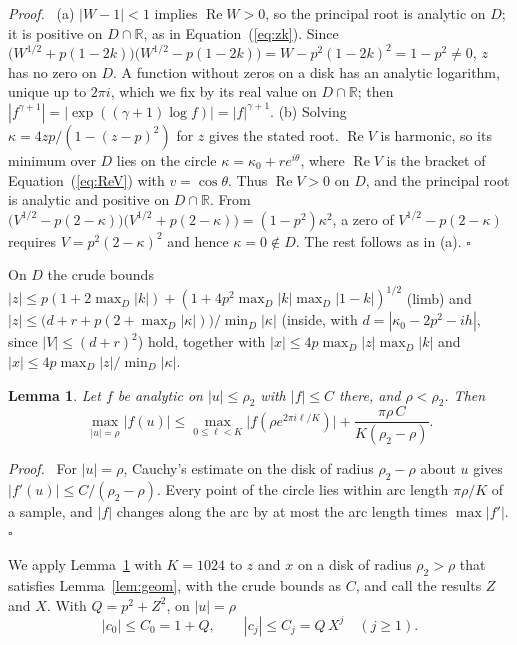 \documentclass[11pt]{article}
\newtheorem{lemma}{Lemma}
\newenvironment{proof}{\par\noindent\textit{Proof.}\ }{\hfill$\square$\par\medskip}
\begin{document}
\begin{proof}
(a) $|W-1|<1$ implies $\operatorname{Re}W>0$, so the principal root is analytic on $D$; it is positive on $D\cap\mathbb R$, as in Equation~(\ref{eq:zk}). Since $\bigl(W^{1/2}+p(1-2k)\bigr)\bigl(W^{1/2}-p(1-2k)\bigr)=W-p^2(1-2k)^2=1-p^2\ne0$, $z$ has no zero on $D$. A function without zeros on a disk has an analytic logarithm, unique up to $2\pi i$, which we fix by its real value on $D\cap\mathbb R$; then $|f^{\gamma+1}|=|\exp((\gamma+1)\log f)|=|f|^{\gamma+1}$.
(b) Solving $\kappa=4zp/(1-(z-p)^2)$ for $z$ gives the stated root. $\operatorname{Re}V$ is harmonic, so its minimum over $D$ lies on the circle $\kappa=\kappa_0+re^{i\theta}$, where $\operatorname{Re}V$ is the bracket of Equation~(\ref{eq:ReV}) with $v=\cos\theta$. Thus $\operatorname{Re}V>0$ on $D$, and the principal root is analytic and positive on $D\cap\mathbb R$. From $\bigl(V^{1/2}-p(2-\kappa)\bigr)\bigl(V^{1/2}+p(2-\kappa)\bigr)=(1-p^2)\kappa^2$, a zero of $V^{1/2}-p(2-\kappa)$ requires $V=p^2(2-\kappa)^2$ and hence $\kappa=0\notin D$. The rest follows as in (a).
\end{proof}

On $D$ the crude bounds $|z|\le p(1+2\max_D|k|)+(1+4p^2\max_D|k|\max_D|1-k|)^{1/2}$ (limb) and $|z|\le\bigl(d+r+p(2+\max_D|\kappa|)\bigr)/\min_D|\kappa|$ (inside, with $d=|\kappa_0-2p^2-ih|$, since $|V|\le(d+r)^2$) hold, together with $|x|\le4p\max_D|z|\max_D|k|$ and $|x|\le4p\max_D|z|/\min_D|\kappa|$.

\begin{lemma} \label{lem:sample}
Let $f$ be analytic on $|u|\le\rho_2$ with $|f|\le C$ there, and $\rho<\rho_2$. Then
\begin{equation}
\max_{|u|=\rho}|f(u)|\le\max_{0\le \ell<K}\bigl|f(\rho e^{2\pi i\ell/K})\bigr|+\frac{\pi\rho\,C}{K(\rho_2-\rho)} .
\end{equation}
\end{lemma}

\begin{proof}
For $|u|=\rho$, Cauchy's estimate on the disk of radius $\rho_2-\rho$ about $u$ gives $|f'(u)|\le C/(\rho_2-\rho)$. Every point of the circle lies within arc length $\pi\rho/K$ of a sample, and $|f|$ changes along the arc by at most the arc length times $\max|f'|$.
\end{proof}

We apply Lemma~\ref{lem:sample} with $K=1024$ to $z$ and $x$ on a disk of radius $\rho_2>\rho$ that satisfies Lemma~\ref{lem:geom}, with the crude bounds as $C$, and call the results $Z$ and $X$. With $Q=p^2+Z^2$, on $|u|=\rho$
\begin{equation}
|c_0|\le C_0=1+Q,\qquad |c_j|\le C_j=Q\,X^j\quad(j\ge1). \label{eq:Cj}
\end{equation}
\end{document}

